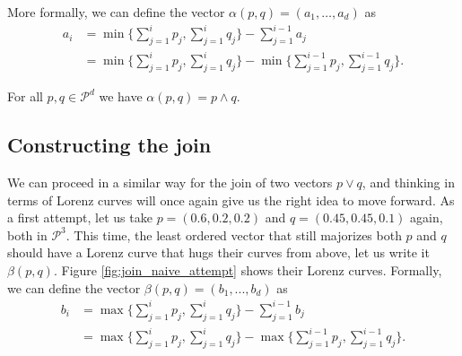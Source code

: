 \noindent More formally, we can define the vector $\alpha(p, q) = (a_1, \dots , a_d)$ as
\begin{align}
    a_i &= \min \Big\{ \sum_{j=1}^{i} p_j , \sum_{j=1}^{i} q_j \Big\} - \sum_{j=1}^{i-1} a_j \label{eq:alpha_bis} \\
    &= \min \Big\{ \sum_{j=1}^{i} p_j , \sum_{j=1}^{i} q_j \Big\} - \min \Big\{ \sum_{j=1}^{i-1} p_j , \sum_{j=1}^{i-1} q_j \Big\}. \label{eq:alpha}
\end{align}

\begin{lemma} \label{lem:meet}
    For all $p, q \in \mathcal{P}^d$ we have $\alpha(p, q) = p \wedge q$.
\end{lemma}



\subsection{Constructing the join} \label{sec:join}

We can proceed in a similar way for the join of two vectors $p \vee q$, and thinking in terms of Lorenz curves will once again give us the right idea to move forward. As a first attempt, let us take $p = (0.6, 0.2, 0.2)$ and $q = (0.45, 0.45, 0.1)$ again, both in $\mathcal{P}^3$. This time, the least ordered vector that still majorizes both $p$ and $q$ should have a Lorenz curve that hugs their curves from above, let us write it $\beta(p, q)$. Figure \ref{fig:join_naive_attempt} shows their Lorenz curves. Formally, we can define the vector $\beta(p, q) = (b_1, ..., b_d)$ as 
\begin{align}
    b_i &= \max \Big\{ \sum_{j=1}^{i} p_j , \sum_{j=1}^{i} q_j \Big\} - \sum_{j=1}^{i-1} b_j \label{eq:beta_bis} \\
    &= \max \Big\{ \sum_{j=1}^{i} p_j , \sum_{j=1}^{i} q_j \Big\} - \max \Big\{ \sum_{j=1}^{i-1} p_j , \sum_{j=1}^{i-1} q_j \Big\}. \label{eq:beta}
\end{align}


